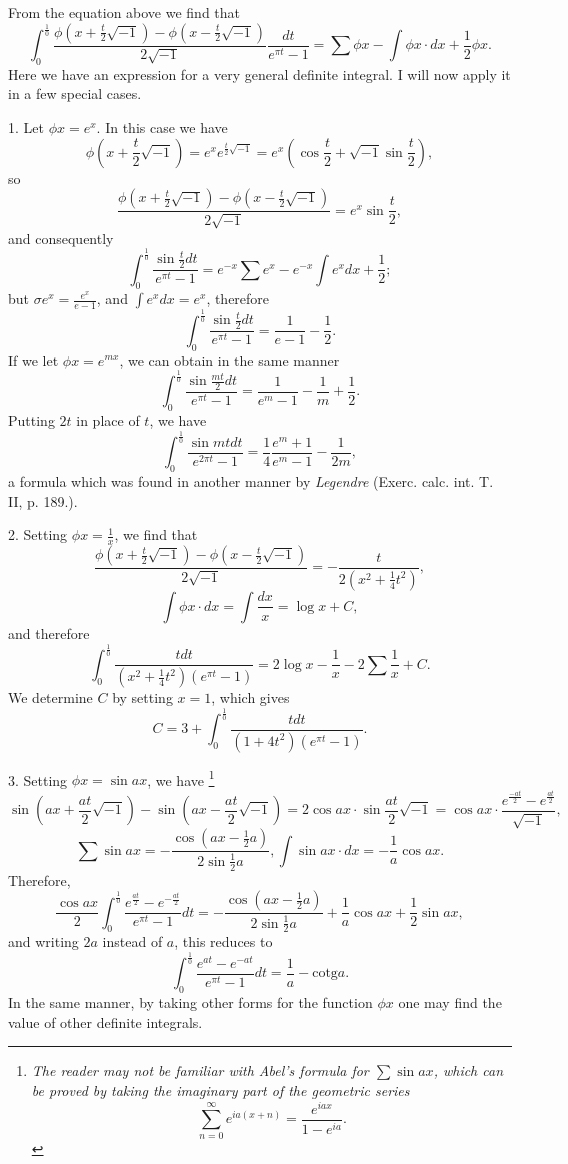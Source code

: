 \documentclass[12pt]{article}
\begin{document}
From the equation above we find that 
\[ \int_0^{\frac{1}{0}} \frac{ \phi(x+ \frac{t}{2} \sqrt{-1}) - \phi(x - \frac{t}{2} \sqrt{-1})}{2 \sqrt{-1}} \frac{dt}{e^{\pi t} - 1} = \sum \phi x - \int \phi x \cdot dx +\frac{1}{2} \phi x . \]
Here we have an expression for a very general definite integral.  I will now apply it in a few special cases.

1. Let $\phi x = e^x$.  In this case we have 
\[ \phi(x + \frac{t}{2}\sqrt{-1}) = e^x e^{\frac{t}{2} \sqrt{-1}} = e^x\left(\cos \frac{t}{2} + \sqrt{-1} \sin \frac{t}{2}\right), \]
so
 \[ \frac{ \phi(x+ \frac{t}{2} \sqrt{-1}) - \phi(x - \frac{t}{2} \sqrt{-1})}{2 \sqrt{-1}} = e^x \sin \frac{t}{2} ,\]
 and consequently
 \[ \int_0^{\frac{1}{0}} \frac{\sin \frac{t}{2} dt}{e^{\pi t} - 1} = e^{-x} \sum e^x - e^{-x} \int e^x dx + \frac{1}{2}; \]
 but $\sigma e^x = \frac{e^x}{e-1}$, and $\int e^x dx = e^x$, therefore
 \[ \int_0^{\frac{1}{0}} \frac{\sin \frac{t}{2} dt}{e^{\pi t}-1} = \frac{1}{e-1} - \frac{1}{2} . \]
If we let $\phi x = e^{mx}$, we can obtain in the same manner 
 \[ \int_0^{\frac{1}{0}} \frac{\sin \frac{mt}{2} dt}{e^{\pi t}-1} = \frac{1}{e^m-1} - \frac{1}{m} + \frac{1}{2} . \]
Putting $2t$ in place of $t$, we have
 \[ \int_0^{\frac{1}{0}} \frac{\sin mt dt}{e^{2\pi t}-1} = \frac{1}{4}\frac{e^m+1}{e^m-1} - \frac{1}{2m} , \]
 a formula which was found in another manner by \emph{Legendre} (Exerc. calc. int. T. II, p. 189.).
 
 2. Setting $\phi x = \frac{1}{x}$, we find that 
 \[ \frac{ \phi(x+ \frac{t}{2} \sqrt{-1}) - \phi(x - \frac{t}{2} \sqrt{-1})}{2 \sqrt{-1}} = - \frac{t}{2(x^2 + \frac{1}{4}t^2)} ,\]
 \[ \int \phi x \cdot dx = \int \frac{dx}{x} = \log x + C, \]
 and therefore
 \[ \int_0^{\frac{1}{0}} \frac{t dt}{(x^2 + \frac{1}{4} t^2)(e^{\pi t} - 1)} = 2 \log x - \frac{1}{x} - 2 \sum \frac{1}{x} + C .\]
 We determine $C$ by setting $x=1$, which gives
\[ C = 3 + \int_0^{\frac{1}{0}} \frac{t dt}{(1+4t^2)(e^{\pi t} -1)} . \]

3. Setting $\phi x = \sin ax$, we have \footnote{ \emph{The reader may not be familiar with Abel's formula for $\sum \sin ax$, which can be proved by taking the imaginary part of the geometric series
\[ \sum_{n=0}^{\infty} e^{ia(x+n)} = \frac{e^{iax}}{1-e^{ia}}. \]}}  
\[ \sin(ax + \frac{at}{2} \sqrt{-1}) - \sin(ax - \frac{at}{2} \sqrt{-1}) = 2 \cos ax \cdot \sin \frac{at}{2} \sqrt{-1} = \cos ax \cdot \frac{e^{\frac{-at}{2}} - e^{\frac{at}{2}}}{ \sqrt{-1}} ,\]
\[ \sum \sin ax = - \frac{\cos(ax - \frac{1}{2} a)}{2 \sin \frac{1}{2} a} , \int \sin ax \cdot dx = - \frac{1}{a} \cos ax. \]
Therefore, 
\[ \frac{\cos ax}{2} \int_0^{\frac{1}{0}} \frac{e^{\frac{at}{2}} - e^{-\frac{at}{2}}}{e^{\pi t} - 1} dt = - \frac{\cos(ax - \frac{1}{2} a)}{2 \sin \frac{1}{2} a} + \frac{1}{a} \cos ax + \frac{1}{2} \sin ax , \]
and writing $2a$ instead of $a$, this reduces to 
\[ \int_0^{\frac{1}{0}} \frac{e^{at} - e^{-at}}{e^{\pi t} - 1} dt = \frac{1}{a} - \mathrm{cotg} a . \]
In the same manner, by taking other forms for the function $\phi x$ one may find the value of other definite integrals.
\end{document}

